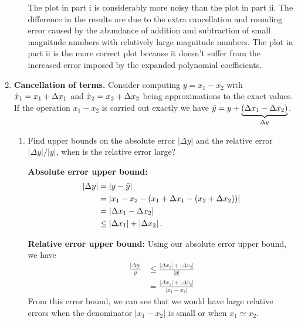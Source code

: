\documentclass[a4paper,10pt]{article}
\newcommand{\abs}[1]{\left| #1 \right|}
\begin{document}
\begin{enumerate}[label = \arabic*.)]
\begin{enumerate}[label = \roman*.]
            The plot in part i is considerably more noisy than the plot in part ii. The difference in the results are due to the extra cancellation and rounding error caused by the abundance of addition and subtraction of small magnitude numbers with relatively large magnitude numbers. The plot in part ii is the more correct plot because it doesn't suffer from the increased error imposed by the expanded polynomial coefficients. 
        \end{enumerate}
        
        \newpage
        \item \textbf{Cancellation of terms.} Consider computing $y = x_1 - x_2$ with $\Tilde{x}_1 = x_1 + \Delta x_1$ and $\Tilde{x}_2 = x_2 + \Delta x_2$ being approximations to the exact values. If the operation $x_1 - x_2$ is carried out exactly we have $\Tilde{y} = y + \underbrace{(\Delta x_1 - \Delta x_2)}_{\Delta y}$.
        
            \begin{enumerate}[label = \roman*.]
                \item Find upper bounds on the absolute error $\abs{\Delta y}$ and the relative error $\abs{\Delta y} / \abs{y}$, when is the relative error large?
                
                \textbf{Absolute error upper bound:}
                \begin{align*}
                    \abs{\Delta y} &= \abs{y - \Tilde{y}} \\
                    &= \abs{x_1 - x_2 - (x_1 + \Delta x_1 - (x_2 + \Delta x_2))} \\
                    &= \abs{\Delta x_1 - \Delta x_2} \\
                    &\leq \abs{\Delta x_1} + \abs{\Delta x_2}.
                \end{align*}
                
                \textbf{Relative error upper bound:} Using our absolute error upper bound, we have
                \begin{align*}
                    \frac{\abs{\Delta y}}{y} &\leq \frac{\abs{\Delta x_1} + \abs{\Delta x_2}}{\abs{y}} \\
                    &= \frac{\abs{\Delta x_1} + \abs{\Delta x_2}}{\abs{x_1 - x_2}}
                \end{align*}
            	From this error bound, we can see that we would have large relative errors when the denominator $ \abs{x_1 - x_2} $ is small or when $ x_1 \simeq x_2 $.
                

\end{enumerate}
\end{enumerate}
\end{document}
